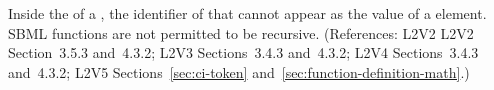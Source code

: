 Inside the  of a \FunctionDefinition, the identifier of that
\FunctionDefinition cannot appear as the value of a  element.
SBML functions are not permitted to be recursive.  (References: L2V2
L2V2 Section~3.5.3 and~4.3.2; L2V3 Sections~3.4.3 and~4.3.2; L2V4 Sections~3.4.3 and~4.3.2; L2V5 Sections~\ref{sec:ci-token}
and~\ref{sec:function-definition-math}.)
